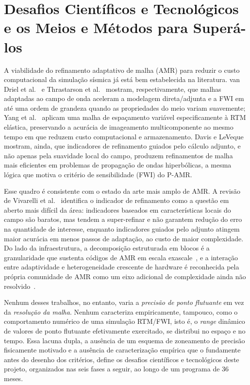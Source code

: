 \documentclass[12pt,a4paper]{article}
\newcommand{\pamr}{P\nobreakdash-AMR}
\begin{document}
\section{Desafios Científicos e Tecnológicos e os Meios e Métodos para
Superá-los}

A viabilidade do refinamento adaptativo de malha (AMR) para reduzir o custo
computacional da simulação sísmica já está bem estabelecida na literatura.
van Driel et al.~\cite{vandriel2020wavefield1} e
Thrastarson et al.~\cite{thrastarson2020wavefield2} mostram,
respectivamente, que malhas adaptadas ao campo de onda aceleram a
modelagem direta/adjunta e a FWI em até uma ordem de grandeza quando as
propriedades do meio variam suavemente; Yang et al.~\cite{yang2024elasticrtm}
aplicam uma malha de espaçamento variável especificamente à RTM elástica,
preservando a acurácia de imageamento multicomponente ao mesmo tempo em que
reduzem custo computacional e armazenamento. Davis e
LeVeque~\cite{davis2015adjoint} mostram, ainda, que indicadores de
refinamento guiados pelo cálculo adjunto, e não apenas pela suavidade
local do campo, produzem refinamentos de malha mais eficientes em
problemas de propagação de ondas hiperbólicas, a mesma lógica que motiva o
critério de sensibilidade (FWI) do \pamr{}.

Esse quadro é consistente com o estado da arte mais amplo de AMR. A revisão
de Vivarelli et al.~\cite{vivarelli2025review} identifica o indicador de
refinamento como a questão em aberto mais difícil da área: indicadores
baseados em características locais do campo são baratos, mas tendem a
super-refinar e não garantem redução do erro na quantidade de interesse,
enquanto indicadores guiados pelo adjunto atingem maior acurácia em menos
passos de adaptação, ao custo de maior complexidade. Do lado da
infraestrutura, a decomposição estruturada em blocos é a granularidade que
sustenta códigos de AMR em escala exascale~\cite{zhang2021amrex}, e a
interação entre adaptividade e heterogeneidade crescente de hardware é
reconhecida pela própria comunidade de AMR como um eixo adicional de
complexidade ainda não resolvido~\cite{dubey2021portability}.

Nenhum desses trabalhos, no entanto, varia a \emph{precisão de ponto
flutuante} em vez da \emph{resolução da malha}. Nenhum caracteriza
empiricamente, tampouco, como o comportamento numérico de uma simulação
RTM/FWI, isto é, o \emph{range} dinâmico de valores de ponto flutuante
efetivamente exercitado, se distribui no espaço e no tempo. Essa lacuna
dupla, a ausência de um esquema de zoneamento de precisão fisicamente
motivado e a ausência de caracterização empírica que o fundamente antes do
desenho dos critérios, define os desafios científicos e tecnológicos deste
projeto, organizados nas seis fases a seguir, ao longo de um programa de 36
meses.
\end{document}

